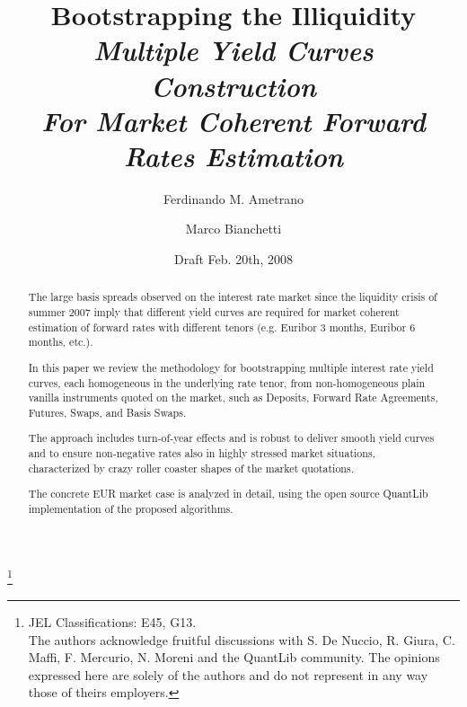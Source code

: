\documentclass[11pt,reqno]{amsart}
\begin{document}
\title[Bootstrapping the Illiquidity]{Bootstrapping the Illiquidity \\ \footnotesize{\emph{Multiple Yield Curves Construction \\
For Market Coherent Forward Rates Estimation}}}

\author{Ferdinando M. Ametrano}
\address{Financial Engineering, Banca IMI, Piazzetta G. Dell'Amore 3, 20121
Milan Italy, ferdinando.ametrano(AT)bancaimi.com}

\author{Marco Bianchetti}
\address{Risk Management, Banca IntesaSanpaolo, Piazza G. Ferrari 10, 20121
Milan Italy, marco.bianchetti(AT)intesasanpaolo.com}

\thanks{JEL Classifications: E45, G13. \\
The authors acknowledge fruitful discussions with S. De Nuccio, R. Giura, C. Maffi, F. Mercurio, N. Moreni and the QuantLib community. The opinions expressed here are solely of the authors and do not represent in any way those of theirs employers.}

\date{Draft Feb. 20th, 2008}


\begin{abstract}
The large basis spreads observed on the interest rate market since the liquidity crisis of summer 2007 imply that different yield curves are required for market coherent estimation of forward rates with different tenors (e.g. Euribor 3 months, Euribor 6 months, etc.).
\par 
In this paper we review the methodology for bootstrapping multiple interest rate yield curves, each homogeneous in the underlying rate tenor, from non-homogeneous plain vanilla instruments quoted on the market, such as Deposits, Forward Rate Agreements, Futures, Swaps, and Basis Swaps.
\par
The approach includes turn-of-year effects and is robust to deliver smooth yield curves and to ensure non-negative rates also in highly stressed market situations, characterized by crazy roller coaster shapes of the market quotations.
\par 
The concrete EUR market case is analyzed in detail, using the open source QuantLib implementation of the proposed algorithms.
\end{abstract}

\maketitle
\end{document}
